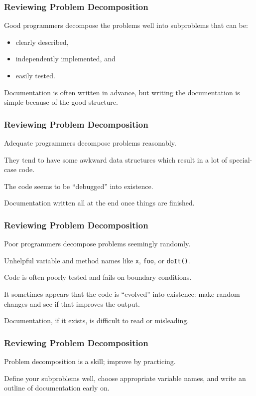 \begin{frame}
\frametitle{Reviewing Problem Decomposition}
\begin{changemargin}{1cm}
Good programmers decompose the problems well into subproblems that can be:
\begin{itemize}
 \item clearly described, 
 \item independently implemented, and 
 \item easily tested. 
\end{itemize}
Documentation is often written in advance, but writing the documentation is simple because of the good structure.

\end{changemargin}
\end{frame}

\begin{frame}
\frametitle{Reviewing Problem Decomposition}
\begin{changemargin}{1cm}
Adequate programmers decompose problems reasonably. 

They tend to have some awkward data structures which result in a lot of special-case code. 

The code seems to be ``debugged'' into existence.

Documentation written all at the end once things are finished.

\end{changemargin}
\end{frame}


\begin{frame}
\frametitle{Reviewing Problem Decomposition}
\begin{changemargin}{1cm}
Poor programmers decompose problems seemingly randomly. 

Unhelpful variable and method names like \texttt{x}, \texttt{foo}, or \texttt{doIt()}. 

Code is often poorly tested and fails on boundary conditions. 

It sometimes appears that the code is ``evolved'' into existence: make random changes and see if that improves the output. 

Documentation, if it exists, is difficult to read or misleading.

\end{changemargin}
\end{frame}

\begin{frame}
\frametitle{Reviewing Problem Decomposition}
\begin{changemargin}{1cm}
Problem decomposition is a skill; improve by practicing.

Define your subproblems well, choose appropriate variable names, and write an outline of documentation early on. 


\end{changemargin}
\end{frame}

